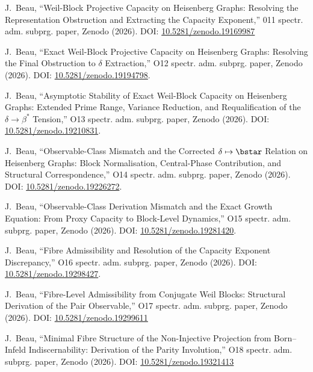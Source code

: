 J.~Beau,
``Weil-Block Projective Capacity on Heisenberg Graphs: Resolving the Representation Obstruction and Extracting the
Capacity Exponent,''
011 spectr. adm. subprg. paper, Zenodo (2026).
DOI: \href{https://doi.org/10.5281/zenodo.19169987}{10.5281/zenodo.19169987}

J.~Beau,
``Exact Weil-Block Projective Capacity on Heisenberg Graphs: Resolving the Final Obstruction to $\delta$ Extraction,''
O12 spectr. adm. subprg. paper, Zenodo (2026).
DOI: \href{https://doi.org/10.5281/zenodo.19194798}{10.5281/zenodo.19194798}.

J.~Beau,
``Asymptotic Stability of Exact Weil-Block Capacity on Heisenberg Graphs: Extended Prime Range, Variance Reduction,
and Requalification of the \(\delta \to \beta^*\) Tension,''
O13 spectr. adm. subprg. paper, Zenodo (2026).
DOI: \href{https://doi.org/10.5281/zenodo.19210831}{10.5281/zenodo.19210831}.

J.~Beau,
``Observable-Class Mismatch and the Corrected $\delta \mapsto \bstar$ Relation on Heisenberg Graphs:
Block Normalisation, Central-Phase Contribution,
and Structural Correspondence,''
O14 spectr. adm. subprg. paper, Zenodo (2026).
DOI: \href{https://doi.org/10.5281/zenodo.19226272}{10.5281/zenodo.19226272}.

J.~Beau,
``Observable-Class Derivation Mismatch and the Exact Growth Equation: From Proxy Capacity to Block-Level Dynamics,''
O15 spectr. adm. subprg. paper, Zenodo (2026).
DOI: \href{https://doi.org/10.5281/zenodo.19281420}{10.5281/zenodo.19281420}.

J.~Beau,
``Fibre Admissibility and Resolution of the Capacity Exponent Discrepancy,''
O16 spectr. adm. subprg. paper, Zenodo (2026).
DOI: \href{https://doi.org/10.5281/zenodo.19298427}{10.5281/zenodo.19298427}.

J.~Beau,
``Fibre-Level Admissibility from Conjugate Weil Blocks: Structural Derivation of the Pair Observable,''
O17 spectr. adm. subprg. paper, Zenodo (2026).
DOI: \href{https://doi.org/10.5281/zenodo.19299611}{10.5281/zenodo.19299611}

J.~Beau,
``Minimal Fibre Structure of the Non-Injective Projection from Born--Infeld Indiscernability:
Derivation of the Parity Involution,''
O18 spectr. adm. subprg. paper, Zenodo (2026).
DOI: \href{https://doi.org/10.5281/zenodo.19321413}{10.5281/zenodo.19321413}

